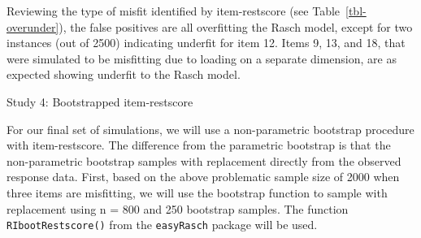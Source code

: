 \documentclass[
  letterpaper,
  DIV=11,
  numbers=noendperiod]{scrartcl}
\begin{document}
Reviewing the type of misfit identified by item-restscore (see
Table~\ref{tbl-overunder}), the false positives are all overfitting the
Rasch model, except for two instances (out of 2500) indicating underfit
for item 12. Items 9, 13, and 18, that were simulated to be misfitting
due to loading on a separate dimension, are as expected showing underfit
to the Rasch model.

Study 4: Bootstrapped item-restscore

For our final set of simulations, we will use a non-parametric bootstrap
procedure with item-restscore. The difference from the parametric
bootstrap is that the non-parametric bootstrap samples with replacement
directly from the observed response data. First, based on the above
problematic sample size of 2000 when three items are misfitting, we will
use the bootstrap function to sample with replacement using n = 800 and
250 bootstrap samples. The function \texttt{RIbootRestscore()} from the
\texttt{easyRasch} package will be used.
\end{document}
